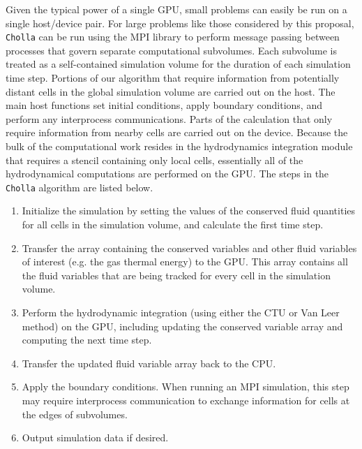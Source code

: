 \documentclass[11pt,letterpaper,english]{article}
\begin{document}
Given the typical power of a single GPU, small problems can easily be run on 
a single host/device pair. For large problems like those considered
by
this proposal, {\tt Cholla} can be run using the MPI library to perform message passing between processes that govern separate computational subvolumes. Each subvolume is treated as a self-contained simulation volume for the duration of each simulation time step. Portions of our algorithm that require information from potentially distant cells in the global simulation volume are carried out on the host. The main host functions set initial conditions, apply boundary conditions, and perform any interprocess communications. Parts of the calculation that only require information from nearby cells are carried out on the device. Because the bulk of the computational work resides in the hydrodynamics integration module that requires a stencil containing only local cells, essentially all of the hydrodynamical computations are performed on the GPU.
The steps in the {\tt Cholla} algorithm are listed below.
\vspace{-.1in}
\begin{enumerate}\itemsep0pt
\item Initialize the simulation by setting the values of the conserved fluid quantities for all cells in the simulation volume, and calculate the first time step.

\item Transfer the array containing the conserved variables and other fluid variables of interest (e.g. the gas thermal energy) to the GPU. This array contains all the fluid variables that are being tracked for every cell in the simulation volume.

\item Perform the hydrodynamic integration (using either the CTU or Van Leer method) on the GPU, including updating the conserved variable array and computing the next time step.

\item Transfer the updated fluid variable array back to the CPU.

\item Apply the boundary conditions. When running an MPI simulation, this step may require interprocess communication to exchange information for cells at the edges of subvolumes.

\item Output simulation data if desired.

\end{enumerate}
\end{document}

